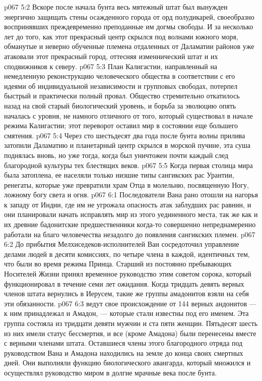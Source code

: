 \vs p067 5:2 Вскоре после начала бунта весь мятежный штат был вынужден энергично защищать стены осажденного города от орд полудикарей, своеобразно воспринявших преждевременно преподанные им догмы свободы. И за несколько лет до того, как этот прекрасный центр скрылся под волнами южного моря, обманутые и неверно обученные племена отдаленных от Даламатии районов уже атаковали этот прекрасный город, оттесняя изменнический штат и их сподвижников к северу.
\vs p067 5:3 План Калигастии, направленный на немедленную реконструкцию человеческого общества в соответствии с его идеями об индивидуальной независимости и групповых свободах, потерпел быстрый и практически полный провал. Общество стремительно откатилось назад на свой старый биологический уровень, и борьба за эволюцию опять началась с уровня, не намного отличного от того, который существовал в начале режима Калигастии; этот переворот оставил мир в состоянии еще большего смятения.
\vs p067 5:4 \pc Через сто шестьдесят два года после бунта волны прилива затопили Даламатию и планетарный центр скрылся в морской пучине, эта суша поднялась вновь, но уже тогда, когда был уничтожен почти каждый след благородной культуры тех блестящих веков.
\vs p067 5:5 Когда первая столица мира была затоплена, ее населяли только низшие типы сангикских рас Урантии, ренегаты, которые уже превратили храм Отца в молельню, посвященную Ногу, ложному богу света и огня.
\vs p067 6:1 Последователи Вана рано отошли на нагорья к западу от Индии, где им не угрожала опасность атак заблудших рас равнин, и они планировали начать исправлять мир из этого уединенного места, так же как и их древние бадонитские предшественники когда\hyp{}то совершенно непреднамеренно работали на благо человечества незадолго до появления сангикских племен.
\vs p067 6:2 До прибытия Мелхиседеков\hyp{}исполнителей Ван сосредоточил управление делами людей в десяти комиссиях, по четыре члена в каждой, идентичных тем, что были во время режима Принца. Старший из постоянно пребывающих Носителей Жизни принял временное руководство этим советом сорока, который функционировал в течение семи лет ожидания. Когда тридцать девять верных членов штата вернулись в Иерусем, такие же группы амадонитов взяли на себя эти обязанности.
\vs p067 6:3  ведут свое происхождение от 144 верных андонитов --- к ним принадлежал и Амадон, --- которые стали известны под его именем. Эта группа состояла из тридцати девяти мужчин и ста пяти женщин. Пятьдесят шесть из них имели статус бессмертия, и все (кроме Амадона) были перенесены вместе с верными членами штата. Оставшиеся члены этого благородного отряда под руководством Вана и Амадона находились на земле до конца своих смертных дней. Они выполняли функцию биологического авангарда, который множился и осуществлял руководство миром в долгие мрачные века после бунта.
